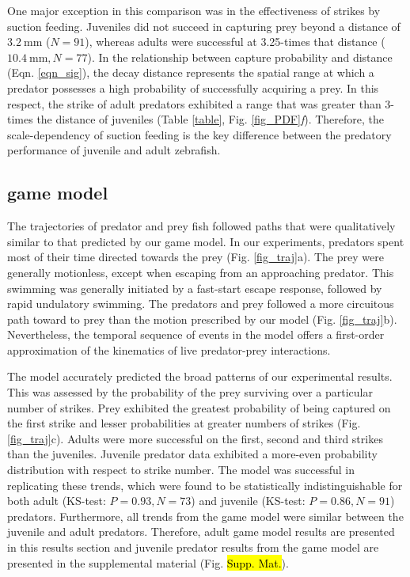 \documentclass[]{rsos}%
\begin{document}
One major exception in this comparison was in the effectiveness of strikes by suction feeding.
Juveniles did not succeed in capturing prey beyond a distance of $\SI{3.2}{\mm}$ ($N = 91$), whereas adults were successful at 3.25-times that distance ($\SI{10.4}{\mm}, N = 77$).
In the relationship between capture probability and distance (Eqn. \ref{eqn_sig}), the decay distance represents the spatial range at which a predator possesses a high probability of successfully acquiring a prey. 
In this respect, the strike of adult predators exhibited a range that was greater than 3-times the distance of juveniles (Table \ref{table}, Fig. \ref{fig_PDF}\textit{f}).
Therefore, the scale-dependency of suction feeding is the key difference between the predatory performance of juvenile and adult zebrafish.

\subsection{game model} %
The trajectories of predator and prey fish followed paths that were qualitatively similar to that predicted by our game model.
In our experiments, predators spent most of their time directed towards the prey (Fig. \ref{fig_traj}a). 
The prey were generally motionless, except when escaping from an approaching predator.
This swimming was generally initiated by a fast-start escape response, followed by rapid undulatory swimming.
The predators and prey followed a more circuitous path toward to prey than the motion prescribed by our model (Fig. \ref{fig_traj}b).
Nevertheless, the temporal sequence of events in the model offers a first-order approximation of the kinematics of live predator-prey interactions.

The model accurately predicted the broad patterns of our experimental results.
This was assessed by the probability of the prey surviving over a particular number of strikes. 
Prey exhibited the greatest probability of being captured on the first strike and lesser probabilities at greater numbers of strikes (Fig. \ref{fig_traj}c).
Adults were more successful on the first, second and third strikes than the juveniles. Juvenile predator data exhibited a more-even probability distribution with respect to strike number.
The model was successful in replicating these trends, which were found to be statistically indistinguishable for both adult (KS-test: $P = 0.93, N = 73$) and juvenile (KS-test: $P = 0.86, N = 91$) predators. Furthermore, all trends from the game model were similar between the juvenile and adult predators. Therefore, adult game model results are presented in this results section and juvenile predator results from the game model are presented in the supplemental material (Fig. \hl{Supp. Mat.}).
\end{document}
